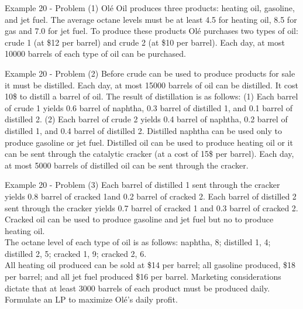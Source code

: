\begin{frame}{Example 20 - Problem (1)}
Olé Oil produces three products: heating oil, gasoline, and jet fuel. The
average octane levels must be at least 4.5 for heating oil, 8.5 for gas and
7.0 for jet fuel. To produce these products Olé purchases two types of oil:
crude 1 (at \$12 per barrel) and crude 2 (at \$10 per barrel). Each day, at
most 10000 barrels of each type of oil can be purchased.
\end{frame}

\begin{frame}{Example 20 - Problem (2)}
Before crude can be used to produce products for sale it must be distilled.
Each day, at most 15000 barrels of oil can be distilled. It cost 10\$ to distill
a barrel of oil. The result of distillation is as follows: (1) Each barrel of
crude 1 yields 0.6 barrel of naphtha, 0.3 barrel of distilled 1, and 0.1 barrel
of distilled 2. (2) Each barrel of crude 2 yields 0.4 barrel of naphtha, 0.2
barrel of distilled 1, and 0.4 barrel of distilled 2. Distilled naphtha can be
used only to produce gasoline or jet fuel. Distilled oil can be used to produce
heating oil or it can be sent through the catalytic cracker (at a cost of 15\$
per barrel). Each day, at most 5000 barrels of distilled oil can be sent
through the cracker.
\end{frame}

\begin{frame}{Example 20 - Problem (3)}
Each barrel of distilled 1 sent through the cracker yields
0.8 barrel of cracked 1and 0.2 barrel of cracked 2. Each barrel of distilled 2
sent through the cracker yields 0.7 barrel of cracked 1 and 0.3 barrel of
cracked 2. Cracked oil can be used to produce gasoline and jet fuel but no to
produce heating oil.\\
\vspace{3mm}
The octane level of each type of oil is as follows: naphtha, 8; distilled 1, 4;
distilled 2, 5; cracked 1, 9; cracked 2, 6. \\
\vspace{3mm}
All heating oil produced can be sold at \$14 per barrel; all gasoline produced,
\$18 per barrel; and all jet fuel produced \$16 per barrel. Marketing
considerations dictate that at least 3000 barrels of each product must be
produced daily. Formulate an LP to maximize Olé’s daily profit.
\end{frame}
